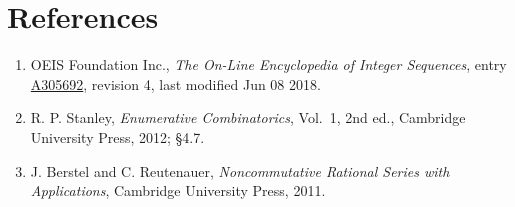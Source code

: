 \documentclass[11pt]{article}
\theoremstyle{definition}
\begin{document}
\section{References}

\begin{enumerate}

\item OEIS Foundation Inc., \emph{The On-Line Encyclopedia of Integer Sequences}, entry \href{https://oeis.org/A305692}{A305692}, revision 4, last modified Jun 08 2018.

\item R. P. Stanley, \emph{Enumerative Combinatorics}, Vol.~1, 2nd ed., Cambridge University Press, 2012; \S4.7.

\item J. Berstel and C. Reutenauer, \emph{Noncommutative Rational Series with Applications}, Cambridge University Press, 2011.

\end{enumerate}
\end{document}
